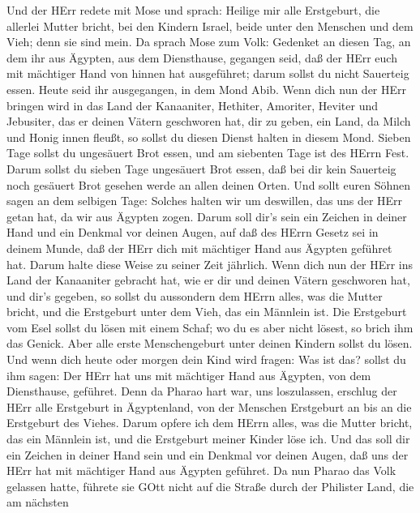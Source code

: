  Und der HErr redete mit Mose und sprach: 
Heilige mir alle Erstgeburt, die allerlei Mutter bricht, bei den Kindern
Israel, beide unter den Menschen und dem Vieh; denn sie sind mein.
 Da sprach Mose zum Volk: Gedenket an diesen Tag, an dem ihr
aus Ägypten, aus dem Diensthause, gegangen seid, daß der HErr euch mit
mächtiger Hand von hinnen hat ausgeführet; darum sollst du nicht
Sauerteig essen.  Heute seid ihr ausgegangen, in dem Mond
Abib.  Wenn dich nun der HErr bringen wird in das Land der
Kanaaniter, Hethiter, Amoriter, Heviter und Jebusiter, das er deinen
Vätern geschworen hat, dir zu geben, ein Land, da Milch und Honig innen
fleußt, so sollst du diesen Dienst halten in diesem Mond. 
Sieben Tage sollst du ungesäuert Brot essen, und am siebenten Tage ist
des HErrn Fest.  Darum sollst du sieben Tage ungesäuert Brot
essen, daß bei dir kein Sauerteig noch gesäuert Brot gesehen werde an
allen deinen Orten.  Und sollt euren Söhnen sagen an dem
selbigen Tage: Solches halten wir um deswillen, das uns der HErr getan
hat, da wir aus Ägypten zogen.  Darum soll dir's sein ein
Zeichen in deiner Hand und ein Denkmal vor deinen Augen, auf daß des
HErrn Gesetz sei in deinem Munde, daß der HErr dich mit mächtiger Hand
aus Ägypten geführet hat.  Darum halte diese Weise zu
seiner Zeit jährlich.  Wenn dich nun der HErr ins Land der
Kanaaniter gebracht hat, wie er dir und deinen Vätern geschworen hat,
und dir's gegeben,  so sollst du aussondern dem HErrn
alles, was die Mutter bricht, und die Erstgeburt unter dem Vieh, das ein
Männlein ist.  Die Erstgeburt vom Esel sollst du lösen mit
einem Schaf; wo du es aber nicht lösest, so brich ihm das Genick. Aber
alle erste Menschengeburt unter deinen Kindern sollst du lösen.
 Und wenn dich heute oder morgen dein Kind wird fragen: Was
ist das? sollst du ihm sagen: Der HErr hat uns mit mächtiger Hand aus
Ägypten, von dem Diensthause, geführet.  Denn da Pharao
hart war, uns loszulassen, erschlug der HErr alle Erstgeburt in
Ägyptenland, von der Menschen Erstgeburt an bis an die Erstgeburt des
Viehes. Darum opfere ich dem HErrn alles, was die Mutter bricht, das ein
Männlein ist, und die Erstgeburt meiner Kinder löse ich. 
Und das soll dir ein Zeichen in deiner Hand sein und ein Denkmal vor
deinen Augen, daß uns der HErr hat mit mächtiger Hand aus Ägypten
geführet.  Da nun Pharao das Volk gelassen hatte, führete
sie GOtt nicht auf die Straße durch der Philister Land, die am nächsten
